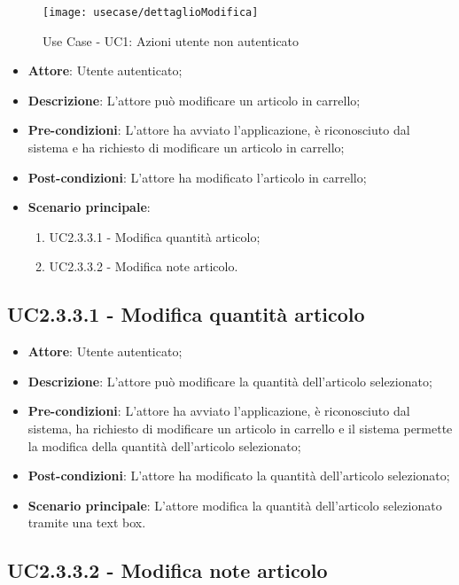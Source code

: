 \begin{figure}[!h] 
    \centering 
    \texttt{[image: usecase/dettaglioModifica]} 
    \caption{Use Case - UC1: Azioni utente non autenticato}
\end{figure}

\begin{itemize}
	\item \textbf{Attore}: Utente autenticato;
	\item \textbf{Descrizione}: L'attore può modificare un articolo in carrello;
	\item \textbf{Pre-condizioni}: L'attore ha avviato l'applicazione, è riconosciuto dal sistema e ha richiesto di modificare un articolo in carrello;
	\item \textbf{Post-condizioni}: L'attore ha modificato l'articolo in carrello;
	\item \textbf{Scenario principale}:
		\begin{enumerate}
			\item UC2.3.3.1 - Modifica quantità articolo;
			\item UC2.3.3.2 - Modifica note articolo.
		\end{enumerate}
\end{itemize}

\subsection{UC2.3.3.1 - Modifica quantità articolo}

\begin{itemize}
	\item \textbf{Attore}: Utente autenticato;
	\item \textbf{Descrizione}: L'attore può modificare la quantità dell'articolo selezionato;
	\item \textbf{Pre-condizioni}: L'attore ha avviato l'applicazione, è riconosciuto dal sistema, ha richiesto di modificare un articolo in carrello e il sistema permette la modifica della quantità dell'articolo selezionato;
	\item \textbf{Post-condizioni}: L'attore ha modificato la quantità dell'articolo selezionato;
	\item \textbf{Scenario principale}: L'attore modifica la quantità dell'articolo selezionato tramite una text box.
\end{itemize}

\subsection{UC2.3.3.2 - Modifica note articolo}

